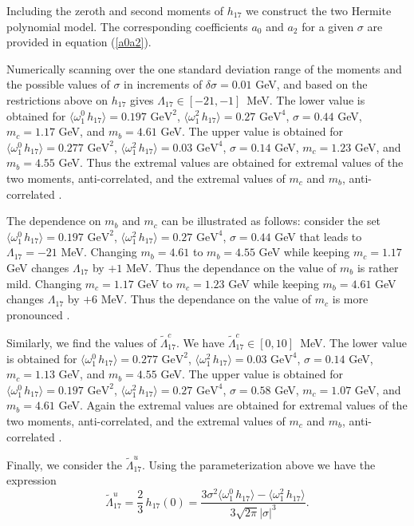 Including the zeroth and second moments of $h_{17}$ we construct the two Hermite polynomial model. The corresponding coefficients $a_0$ and $a_2$ for a given $\sigma$ are provided in equation (\ref{a0a2}).\par
Numerically scanning over the one standard deviation range of the moments and  the possible values of $\sigma$ in increments of  $\delta\sigma=0.01$ GeV, and based on the restrictions above on $h_{17}$ gives $\Lambda_{17}\in[-21,-1]$~MeV. The lower value is obtained for  $\langle\omega_1^0\,h_{17}\rangle=0.197\mbox{ GeV}^2$, $\langle\omega_1^2\,h_{17}\rangle=0.27\mbox{ GeV}^4$, $\sigma=0.44$ GeV, $m_c=1.17$ GeV, and $m_b=4.61$ GeV. The upper value is obtained for $\langle\omega_1^0\,h_{17}\rangle=0.277\mbox{ GeV}^2$, $\langle\omega_1^2\,h_{17}\rangle=0.03\mbox{ GeV}^4$, $\sigma=0.14$ GeV, $m_c=1.23$ GeV, and $m_b=4.55$ GeV. Thus the extremal values are obtained for extremal values of the two moments, anti-correlated, and the extremal values of $m_c$ and $m_b$, anti-correlated \cite{Gunawardana:2019gep}.\par
The dependence on $m_b$ and $m_c$ can be illustrated as follows: consider the set $\langle\omega_1^0\,h_{17}\rangle=0.197\mbox{ GeV}^2$, $\langle\omega_1^2\,h_{17}\rangle=0.27\mbox{ GeV}^4$, $\sigma=0.44$ GeV that leads to $\Lambda_{17}=-21$ MeV. Changing $m_b=4.61$ to $m_b=4.55$ GeV  while keeping $m_c=1.17$ GeV changes $\Lambda_{17}$ by $+1$ MeV. Thus the dependance on the value of $m_b$ is rather mild.  Changing $m_c=1.17$ GeV to $m_c=1.23$ GeV while keeping $m_b=4.61$ GeV changes $\Lambda_{17}$ by $+6$ MeV. Thus the dependance on the value of $m_c$ is more pronounced \cite{Gunawardana:2019gep}.\par
Similarly, we find the values of $\tilde{\Lambda}^c_{17}$. We have $\tilde\Lambda_{17}^c\in[0,10]$~MeV. The lower value is obtained for  $\langle\omega_1^0\,h_{17}\rangle=0.277\mbox{ GeV}^2$, $\langle\omega_1^2\,h_{17}\rangle=0.03\mbox{ GeV}^4$, $\sigma=0.14$ GeV, $m_c=1.13$ GeV, and $m_b=4.55$ GeV. The upper value is obtained for $\langle\omega_1^0\,h_{17}\rangle=0.197\mbox{ GeV}^2$, $\langle\omega_1^2\,h_{17}\rangle=0.27\mbox{ GeV}^4$, $\sigma=0.58$ GeV, $m_c=1.07$ GeV, and $m_b=4.61$ GeV. Again the extremal values are obtained for extremal values of the two moments, anti-correlated, and the extremal values of $m_c$ and $m_b$, anti-correlated \cite{Gunawardana:2019gep}.\par 
Finally, we consider the $\tilde{\Lambda}^u_{17}$. Using the parameterization above we have the expression 
\begin{equation} 
\tilde\Lambda_{17}^u = \frac23\,h_{17}(0)=\dfrac{3\sigma^2\langle\omega_1^0\,h_{17}\rangle-\langle\omega_1^2\,h_{17}\rangle}{3\sqrt{2\pi}|\sigma|^3}.
 \end{equation}
